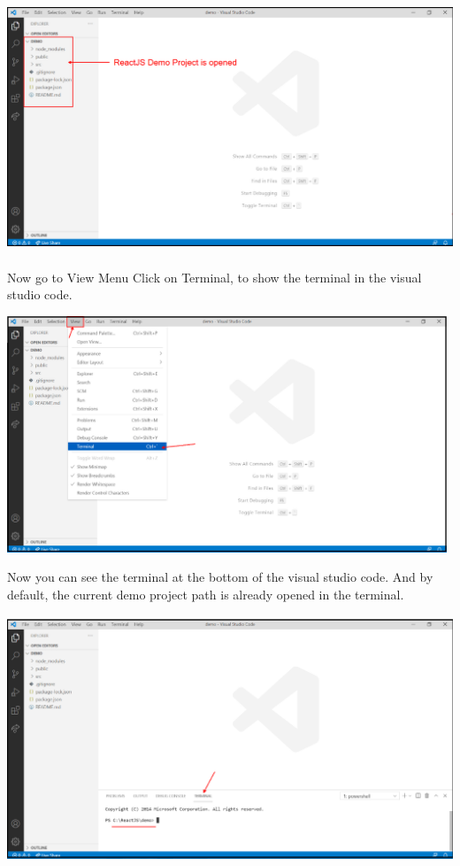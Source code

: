 \documentclass{article}
\begin{document}
\begin{center}
	\noindent \includegraphics*[width=5.51in, height=2.96in]{IMG-06-39}
\end{center}

 
\noindent Now go to View Menu  Click on Terminal, to show the terminal in the visual studio code.
 

\begin{center}
	\noindent \includegraphics*[width=5.18in, height=2.78in]{IMG-06-40}
\end{center}
\newpage
\noindent Now you can see the terminal at the bottom of the visual studio code. And by default, the current demo project path is already opened in the terminal.
 

\begin{center}
	\noindent \includegraphics*[width=5.37in, height=2.89in]{IMG-06-41}
\end{center}
\end{document}
